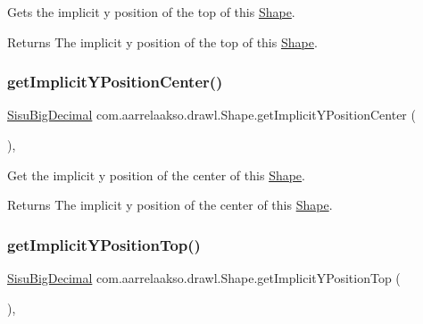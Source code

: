 Gets the implicit y position of the top of this \hyperlink{classcom_1_1aarrelaakso_1_1drawl_1_1_shape}{Shape}.

\begin{DoxyReturn}{Returns}
The implicit y position of the top of this \hyperlink{classcom_1_1aarrelaakso_1_1drawl_1_1_shape}{Shape}. 
\end{DoxyReturn}
\mbox{\label{classcom_1_1aarrelaakso_1_1drawl_1_1_shape_ad10def6c8dd7cbe03c281817406ab461}} 
\subsubsection{\texorpdfstring{get\+Implicit\+Y\+Position\+Center()}{getImplicitYPositionCenter()}}
{\footnotesize\ttfamily \hyperlink{classcom_1_1aarrelaakso_1_1drawl_1_1_sisu_big_decimal}{Sisu\+Big\+Decimal} com.\+aarrelaakso.\+drawl.\+Shape.\+get\+Implicit\+Y\+Position\+Center (\begin{DoxyParamCaption}{ }\end{DoxyParamCaption})\hspace{0.3cm}{\ttfamily [protected]}, {\ttfamily [inherited]}}

Get the implicit y position of the center of this \hyperlink{classcom_1_1aarrelaakso_1_1drawl_1_1_shape}{Shape}.

\begin{DoxyReturn}{Returns}
The implicit y position of the center of this \hyperlink{classcom_1_1aarrelaakso_1_1drawl_1_1_shape}{Shape}. 
\end{DoxyReturn}
\mbox{\label{classcom_1_1aarrelaakso_1_1drawl_1_1_shape_a5ffc02627cca0723e3555b5d04ba2b75}} 
\subsubsection{\texorpdfstring{get\+Implicit\+Y\+Position\+Top()}{getImplicitYPositionTop()}}
{\footnotesize\ttfamily \hyperlink{classcom_1_1aarrelaakso_1_1drawl_1_1_sisu_big_decimal}{Sisu\+Big\+Decimal} com.\+aarrelaakso.\+drawl.\+Shape.\+get\+Implicit\+Y\+Position\+Top (\begin{DoxyParamCaption}{ }\end{DoxyParamCaption})\hspace{0.3cm}{\ttfamily [protected]}, {\ttfamily [inherited]}}

